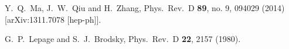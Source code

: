 \documentclass[english,preprint,aps,prd,showpacs,superscriptaddress,nofootinbib,tightenlines]{revtex4}
\begin{document}
\begin{thebibliography}{99}
  Y.~Q.~Ma, J.~W.~Qiu and H.~Zhang,
  Phys.\ Rev.\ D {\bf 89}, no. 9, 094029 (2014)
  [arXiv:1311.7078 [hep-ph]].

  G.~P.~Lepage and S.~J.~Brodsky,
  Phys.\ Rev.\ D {\bf 22}, 2157 (1980).






\end{thebibliography}
\end{document}
